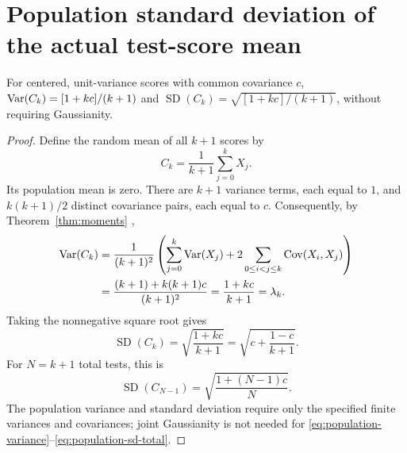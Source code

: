 \section{Population standard deviation of the actual test-score mean}
\begin{proposition}
\label{prop:population-sd}
For centered, unit-variance scores with common covariance \(c\),
\(\operatorname{Var}(C_k)=[1+kc]/(k+1)\) and
\(\operatorname{SD}(C_k)=\sqrt{[1+kc]/(k+1)}\), without requiring Gaussianity.
\end{proposition}
\begin{proof}
Define the random mean of all \(k+1\) scores by
\begin{equation}
  C_k=\frac1{k+1}\sum_{j=0}^{k}X_j.
  \label{eq:actual-average}
\end{equation}
Its population mean is zero. There are \(k+1\) variance terms, each equal
to \(1\), and \(k(k+1)/2\) distinct covariance pairs, each equal to \(c\).
Consequently, by Theorem~\ref{thm:moments}
\citep[summary Section 4.2]{bertsekas2008},
\begin{align}
  \operatorname{Var}(C_k)
  &=\frac1{(k+1)^2}
    \left(\sum_{j=0}^{k}\operatorname{Var}(X_j)
           +2\sum_{0\leq i<j\leq k}\operatorname{Cov}(X_i,X_j)\right)\notag\\
  &=\frac{(k+1)+k(k+1)c}{(k+1)^2}
   =\frac{1+kc}{k+1}=\lambda_k.
   \label{eq:population-variance}
\end{align}
Taking the nonnegative square root gives
\begin{equation}
  \boxed{\operatorname{SD}(C_k)
    =\sqrt{\frac{1+kc}{k+1}}
    =\sqrt{c+\frac{1-c}{k+1}}.}
  \label{eq:population-sd}
\end{equation}
For \(N=k+1\) total tests, this is
\begin{equation}
  \boxed{\operatorname{SD}(C_{N-1})
    =\sqrt{\frac{1+(N-1)c}{N}}.}
  \label{eq:population-sd-total}
\end{equation}
The population variance and standard deviation require only the specified
finite variances and covariances; joint Gaussianity is not needed for
\eqref{eq:population-variance}--\eqref{eq:population-sd-total}.
\end{proof}

